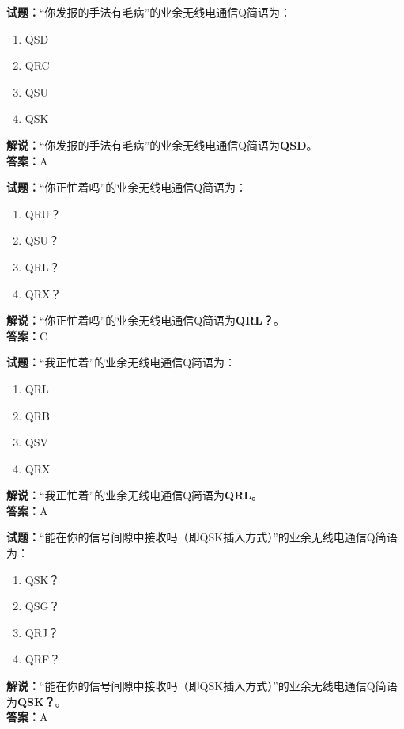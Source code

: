 \documentclass{ctexbook}
\begin{document}
\vspace{1em}

\textbf{试题：}“你发报的手法有毛病”的业余无线电通信Q简语为：
\begin{enumerate}[leftmargin=3em]
  \item QSD
  \item QRC
  \item QSU
  \item QSK
\end{enumerate}
\noindent\textbf{解说：}“你发报的手法有毛病”的业余无线电通信Q简语为\textbf{QSD}。\\\noindent\textbf{答案：}A

\vspace{1em}

\textbf{试题：}“你正忙着吗”的业余无线电通信Q简语为：
\begin{enumerate}[leftmargin=3em]
  \item QRU？
  \item QSU？
  \item QRL？
  \item QRX？
\end{enumerate}
\noindent\textbf{解说：}“你正忙着吗”的业余无线电通信Q简语为\textbf{QRL？}。\\\noindent\textbf{答案：}C

\vspace{1em}

\textbf{试题：}“我正忙着”的业余无线电通信Q简语为：
\begin{enumerate}[leftmargin=3em]
  \item QRL
  \item QRB
  \item QSV
  \item QRX
\end{enumerate}
\noindent\textbf{解说：}“我正忙着”的业余无线电通信Q简语为\textbf{QRL}。\\\noindent\textbf{答案：}A

\vspace{1em}

\textbf{试题：}“能在你的信号间隙中接收吗（即QSK插入方式）”的业余无线电通信Q简语为：
\begin{enumerate}[leftmargin=3em]
  \item QSK？
  \item QSG？
  \item QRJ？
  \item QRF？
\end{enumerate}
\noindent\textbf{解说：}“能在你的信号间隙中接收吗（即QSK插入方式）”的业余无线电通信Q简语为\textbf{QSK？}。\\\noindent\textbf{答案：}A
\end{document}
